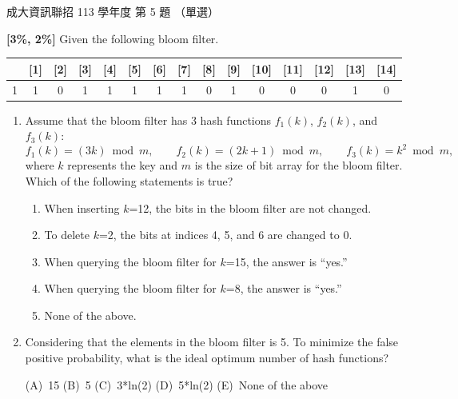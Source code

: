 \begin{pastexam}[label={px:ncku-113-prog-05}]{成大資訊聯招 113 學年度 第 5 題}
（單選）

\textbf{[3\%, 2\%]} Given the following bloom filter.
\begin{center}
\small
\begin{tabular}{|*{15}{c|}}
\hline
[0] & [1] & [2] & [3] & [4] & [5] & [6] & [7] & [8] & [9] & [10] & [11] & [12] & [13] & [14] \\ \hline
1 & 1 & 0 & 1 & 1 & 1 & 1 & 1 & 0 & 1 & 0 & 0 & 0 & 1 & 0 \\ \hline
\end{tabular}
\end{center}
\begin{enumerate}[label=\roman*)]
\item Assume that the bloom filter has 3 hash functions $f_1(k)$, $f_2(k)$, and $f_3(k)$:
\[ f_1(k)=(3k) \bmod m,\qquad f_2(k)=(2k+1) \bmod m,\qquad f_3(k)=k^2 \bmod m, \]
where $k$ represents the key and $m$ is the size of bit array for the bloom filter. Which of the
following statements is true?
\begin{enumerate}[label=(\Alph*)]
\item When inserting $k$=12, the bits in the bloom filter are not changed.
\item To delete $k$=2, the bits at indices 4, 5, and 6 are changed to 0.
\item When querying the bloom filter for $k$=15, the answer is ``yes.''
\item When querying the bloom filter for $k$=8, the answer is ``yes.''
\item None of the above.
\end{enumerate}
\item Considering that the elements in the bloom filter is 5. To minimize the false positive
probability, what is the ideal optimum number of hash functions?

(A)~15 \qquad (B)~5 \qquad (C)~3*ln(2) \qquad (D)~5*ln(2) \qquad (E)~None of the above
\end{enumerate}
\end{pastexam}

